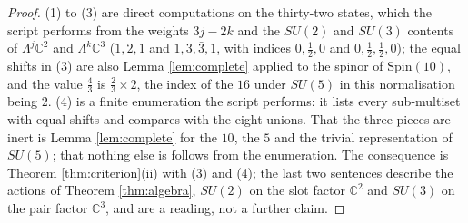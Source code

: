 \documentclass[11pt]{article}
\theoremstyle{definition}
\newcommand{\C}{\mathbb{C}}
\begin{document}
\begin{proof}
(1) to (3) are direct computations on the thirty-two states, which the script performs from the weights $3j - 2k$ and the $SU(2)$ and $SU(3)$ contents of $\Lambda^{j}\C^{2}$ and $\Lambda^{k}\C^{3}$ ($1, 2, 1$ and $1, 3, \bar{3}, 1$, with indices $0, \tfrac12, 0$ and $0, \tfrac12, \tfrac12, 0$); the equal shifts in (3) are also Lemma \ref{lem:complete} applied to the spinor of $\mathrm{Spin}(10)$, and the value $\tfrac43$ is $\tfrac23 \times 2$, the index of the $16$ under $SU(5)$ in this normalisation being $2$. (4) is a finite enumeration the script performs: it lists every sub-multiset with equal shifts and compares with the eight unions. That the three pieces are inert is Lemma \ref{lem:complete} for the $10$, the $\bar{5}$ and the trivial representation of $SU(5)$; that nothing else is follows from the enumeration. The consequence is Theorem \ref{thm:criterion}(ii) with (3) and (4); the last two sentences describe the actions of Theorem \ref{thm:algebra}, $SU(2)$ on the slot factor $\C^{2}$ and $SU(3)$ on the pair factor $\C^{3}$, and are a reading, not a further claim.
\end{proof}
\end{document}
